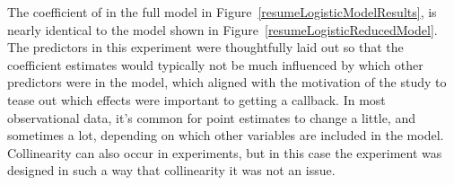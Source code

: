 

The coefficient of  in the full model in
Figure~\ref{resumeLogisticModelResults},
is nearly identical to the model shown in
Figure~\ref{resumeLogisticReducedModel}.
The predictors in this experiment were thoughtfully
laid out so that the coefficient estimates would typically
not be much influenced by which other predictors were 
in the model,
which aligned with the motivation of the study to tease
out which effects were important to getting a callback.
In most observational data,
it's common for point estimates to change a little,
and sometimes a lot, depending on which other
variables are included in the model.
Collinearity can also occur in experiments,
but in this case the experiment was designed in such a way
that collinearity it was not an issue.

